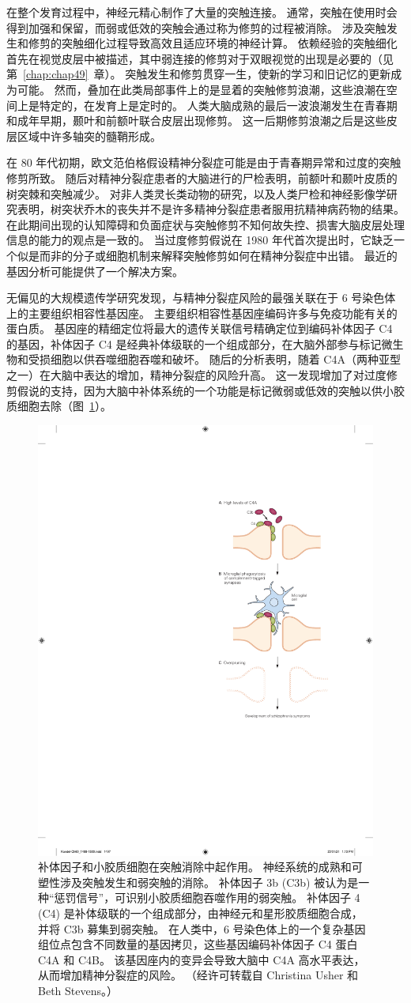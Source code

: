 在整个发育过程中，神经元精心制作了大量的突触连接。
通常，突触在使用时会得到加强和保留，而弱或低效的突触会通过称为修剪的过程被消除。
涉及突触发生和修剪的突触细化过程导致高效且适应环境的神经计算。
依赖经验的突触细化首先在视觉皮层中被描述，其中弱连接的修剪对于双眼视觉的出现是必要的（见第~\ref{chap:chap49}~章）。
突触发生和修剪贯穿一生，使新的学习和旧记忆的更新成为可能。
然而，叠加在此类局部事件上的是显着的突触修剪浪潮，这些浪潮在空间上是特定的，在发育上是定时的。
人类大脑成熟的最后一波浪潮发生在青春期和成年早期，颞叶和前额叶联合皮层出现修剪。
这一后期修剪浪潮之后是这些皮层区域中许多轴突的髓鞘形成。


在 80 年代初期，欧文范伯格假设精神分裂症可能是由于青春期异常和过度的突触修剪所致。
随后对精神分裂症患者的大脑进行的尸检表明，前额叶和颞叶皮质的树突棘和突触减少。
对非人类灵长类动物的研究，以及人类尸检和神经影像学研究表明，树突状乔木的丧失并不是许多精神分裂症患者服用抗精神病药物的结果。
在此期间出现的认知障碍和负面症状与突触修剪不知何故失控、损害大脑皮层处理信息的能力的观点是一致的。
当过度修剪假说在 1980 年代首次提出时，它缺乏一个似是而非的分子或细胞机制来解释突触修剪如何在精神分裂症中出错。
最近的基因分析可能提供了一个解决方案。


无偏见的大规模遗传学研究发现，与精神分裂症风险的最强关联在于 6 号染色体上的主要组织相容性基因座。
主要组织相容性基因座编码许多与免疫功能有关的蛋白质。
基因座的精细定位将最大的遗传关联信号精确定位到编码补体因子 C4 的基因，补体因子 C4 是经典补体级联的一个组成部分，在大脑外部参与标记微生物和受损细胞以供吞噬细胞吞噬和破坏。
随后的分析表明，随着 C4A（两种亚型之一）在大脑中表达的增加，精神分裂症的风险升高。
这一发现增加了对过度修剪假说的支持，因为大脑中补体系统的一个功能是标记微弱或低效的突触以供小胶质细胞去除（图~\ref{fig:60_7}）。


\begin{figure}[htbp]
	\centering
	\includegraphics[width=0.45\linewidth]{chap60/fig_60_7}
	\caption{补体因子和小胶质细胞在突触消除中起作用。
		神经系统的成熟和可塑性涉及突触发生和弱突触的消除。
		补体因子 3b (C3b) 被认为是一种“惩罚信号”，可识别小胶质细胞吞噬作用的弱突触。
		补体因子 4 (C4) 是补体级联的一个组成部分，由神经元和星形胶质细胞合成，并将 C3b 募集到弱突触。
		在人类中，6 号染色体上的一个复杂基因组位点包含不同数量的基因拷贝，这些基因编码补体因子 C4 蛋白 C4A 和 C4B。
		该基因座内的变异会导致大脑中 C4A 高水平表达，从而增加精神分裂症的风险。 （经许可转载自 Christina Usher 和 Beth Stevens。）}
	\label{fig:60_7}
\end{figure}


